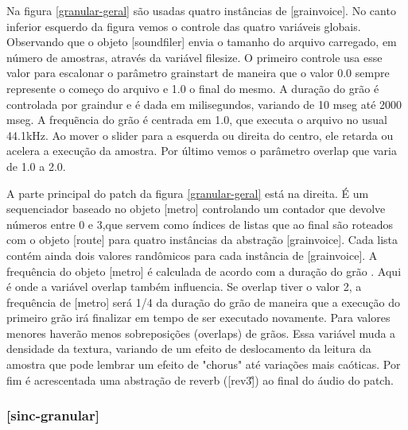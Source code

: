 \documentclass{ppgmus}
\begin{document}
Na figura \ref{granular-geral} são usadas quatro instâncias de [grainvoice]. No canto inferior esquerdo da figura
vemos o controle das quatro variáveis globais. Observando que o objeto [soundfiler] envia o tamanho do arquivo
carregado, em número de amostras, através da variável filesize. O primeiro controle usa esse valor para escalonar
o parâmetro grainstart de maneira que o valor 0.0 sempre represente o começo do arquivo e 1.0 o final do mesmo.
A duração do grão é controlada por graindur e é dada em milisegundos, variando de 10 mseg até 2000 mseg.
A frequẽncia do grão é centrada em 1.0, que executa o arquivo no usual 44.1kHz. Ao mover o slider para a esquerda
ou direita do centro, ele retarda ou acelera a execução da amostra. Por último vemos o parâmetro overlap que varia de
1.0 a 2.0.

A parte principal do patch da figura \ref{granular-geral} está na direita. É um sequenciador baseado no objeto
[metro] controlando um contador que devolve números entre 0 e 3,que servem como índices de listas que ao final
são roteados com o objeto [route] para quatro instâncias da abstração [grainvoice]. Cada lista contém ainda dois
valores randômicos para cada instância de [grainvoice]. A frequência do objeto [metro] é calculada de acordo com a duração
do grão . Aqui é onde a variável
overlap também influencia. Se overlap tiver o valor 2, a frequência de [metro] será 1/4 da duração
do grão de maneira que a execução do primeiro grão irá finalizar em tempo de ser executado novamente.
Para valores menores haverão menos sobreposições (overlaps) de grãos. Essa variável muda a densidade da
textura, variando de um efeito de deslocamento da leitura da amostra que pode lembrar um efeito de 
"chorus" até variações mais caóticas. Por fim é acrescentada uma abstração de reverb ([rev3\~]) ao final
do áudio do patch.



\subsubsection{[sinc-granular]}



\end{document}

